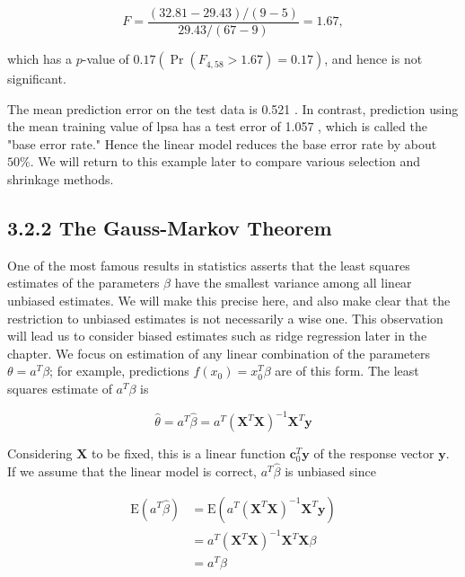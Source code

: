\documentclass[10pt]{article}
\begin{document}
\begin{equation*}
F=\frac{(32.81-29.43) /(9-5)}{29.43 /(67-9)}=1.67, \tag{3.16}
\end{equation*}


which has a $p$-value of $0.17\left(\operatorname{Pr}\left(F_{4,58}>1.67\right)=0.17\right)$, and hence is not significant.

The mean prediction error on the test data is 0.521 . In contrast, prediction using the mean training value of lpsa has a test error of 1.057 , which is called the "base error rate." Hence the linear model reduces the base error rate by about $50 \%$. We will return to this example later to compare various selection and shrinkage methods.

\subsection*{3.2.2 The Gauss-Markov Theorem}
One of the most famous results in statistics asserts that the least squares estimates of the parameters $\beta$ have the smallest variance among all linear unbiased estimates. We will make this precise here, and also make clear that the restriction to unbiased estimates is not necessarily a wise one. This observation will lead us to consider biased estimates such as ridge regression later in the chapter. We focus on estimation of any linear combination of the parameters $\theta=a^{T} \beta$; for example, predictions $f\left(x_{0}\right)=x_{0}^{T} \beta$ are of this form. The least squares estimate of $a^{T} \beta$ is


\begin{equation*}
\hat{\theta}=a^{T} \hat{\beta}=a^{T}\left(\mathbf{X}^{T} \mathbf{X}\right)^{-1} \mathbf{X}^{T} \mathbf{y} \tag{3.17}
\end{equation*}


Considering $\mathbf{X}$ to be fixed, this is a linear function $\mathbf{c}_{0}^{T} \mathbf{y}$ of the response vector $\mathbf{y}$. If we assume that the linear model is correct, $a^{T} \hat{\beta}$ is unbiased since


\begin{align*}
\mathrm{E}\left(a^{T} \hat{\beta}\right) & =\mathrm{E}\left(a^{T}\left(\mathbf{X}^{T} \mathbf{X}\right)^{-1} \mathbf{X}^{T} \mathbf{y}\right) \\
& =a^{T}\left(\mathbf{X}^{T} \mathbf{X}\right)^{-1} \mathbf{X}^{T} \mathbf{X} \beta \\
& =a^{T} \beta \tag{3.18}
\end{align*}
\end{document}
